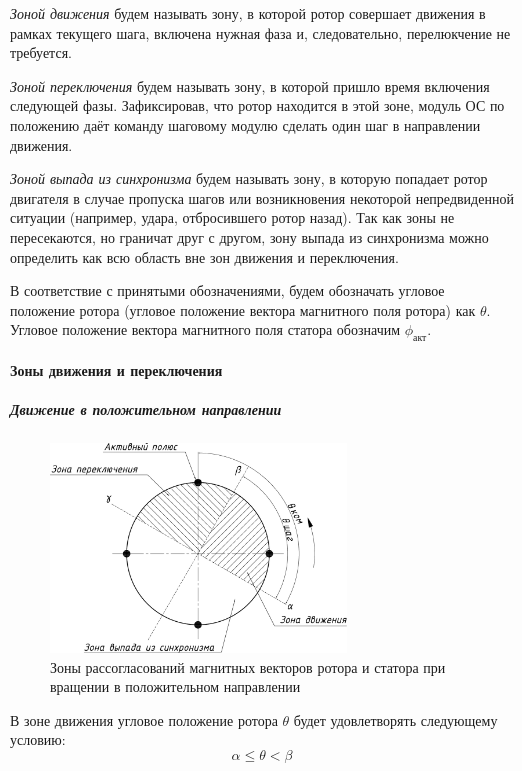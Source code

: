 \textit{Зоной движения} будем называть зону, в которой ротор совершает движения
в рамках текущего шага, включена нужная фаза и, следовательно, перелюкчение не
требуется.

\textit{Зоной переключения} будем называть зону, в которой пришло время
включения следующей фазы. Зафиксировав, что ротор находится в этой зоне, модуль
ОС по положению даёт команду шаговому модулю сделать один шаг в направлении
движения.

\textit{Зоной выпада из синхронизма} будем называть зону, в которую попадает
ротор двигателя в случае пропуска шагов или возникновения некоторой
непредвиденной ситуации (например, удара, отбросившего ротор назад).
Так как зоны не пересекаются, но граничат друг с другом, зону выпада из
синхронизма можно определить как всю область вне зон движения и переключения.

В соответствие с принятыми обозначениями, будем обозначать угловое положение
ротора (угловое положение вектора магнитного поля ротора) как $\theta$.
Угловое положение вектора магнитного поля статора обозначим $\phi_\textit{акт}$.

\paragraph{Зоны движения и переключения}
\subparagraph{Движение в положительном направлении}
\begin{figure}
    \centering
    \includegraphics[width=0.7\textwidth, keepaspectratio]
                    {./src/pictures/feedback_control/pole_switch_zones_with_positive_dir}
    \caption{Зоны рассогласований магнитных векторов ротора и статора при вращении в положительном направлении}
    \label{pole_switch_zones_with_positive_dir}
\end{figure}

В зоне движения угловое положение ротора $\theta$ будет удовлетворять следующему
условию:
$$
    \alpha \leq \theta < \beta
$$

